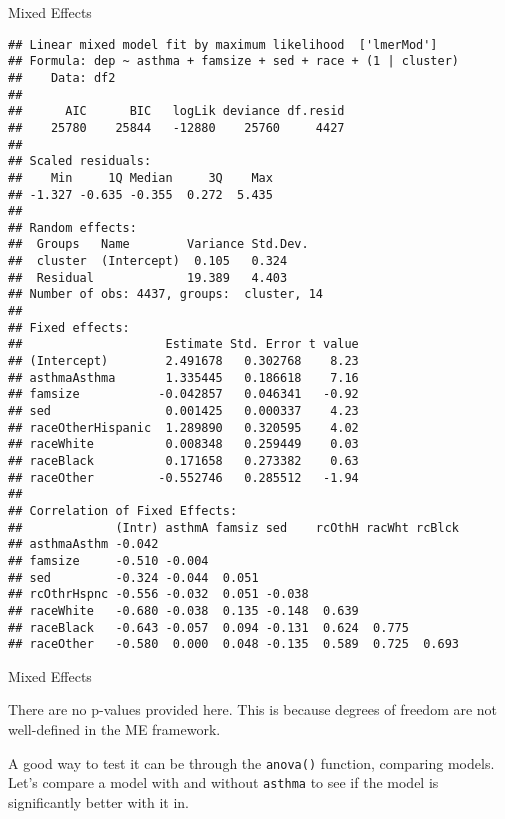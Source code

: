\begin{frame}[fragile]{Mixed Effects}

\tiny

\begin{verbatim}
## Linear mixed model fit by maximum likelihood  ['lmerMod']
## Formula: dep ~ asthma + famsize + sed + race + (1 | cluster)
##    Data: df2
## 
##      AIC      BIC   logLik deviance df.resid 
##    25780    25844   -12880    25760     4427 
## 
## Scaled residuals: 
##    Min     1Q Median     3Q    Max 
## -1.327 -0.635 -0.355  0.272  5.435 
## 
## Random effects:
##  Groups   Name        Variance Std.Dev.
##  cluster  (Intercept)  0.105   0.324   
##  Residual             19.389   4.403   
## Number of obs: 4437, groups:  cluster, 14
## 
## Fixed effects:
##                    Estimate Std. Error t value
## (Intercept)        2.491678   0.302768    8.23
## asthmaAsthma       1.335445   0.186618    7.16
## famsize           -0.042857   0.046341   -0.92
## sed                0.001425   0.000337    4.23
## raceOtherHispanic  1.289890   0.320595    4.02
## raceWhite          0.008348   0.259449    0.03
## raceBlack          0.171658   0.273382    0.63
## raceOther         -0.552746   0.285512   -1.94
## 
## Correlation of Fixed Effects:
##             (Intr) asthmA famsiz sed    rcOthH racWht rcBlck
## asthmaAsthm -0.042                                          
## famsize     -0.510 -0.004                                   
## sed         -0.324 -0.044  0.051                            
## rcOthrHspnc -0.556 -0.032  0.051 -0.038                     
## raceWhite   -0.680 -0.038  0.135 -0.148  0.639              
## raceBlack   -0.643 -0.057  0.094 -0.131  0.624  0.775       
## raceOther   -0.580  0.000  0.048 -0.135  0.589  0.725  0.693
\end{verbatim}

\end{frame}

\begin{frame}[fragile]{Mixed Effects}

There are no p-values provided here. This is because degrees of freedom
are not well-defined in the ME framework.

A good way to test it can be through the \texttt{anova()} function,
comparing models. Let's compare a model with and without \texttt{asthma}
to see if the model is significantly better with it in.

\end{frame}

